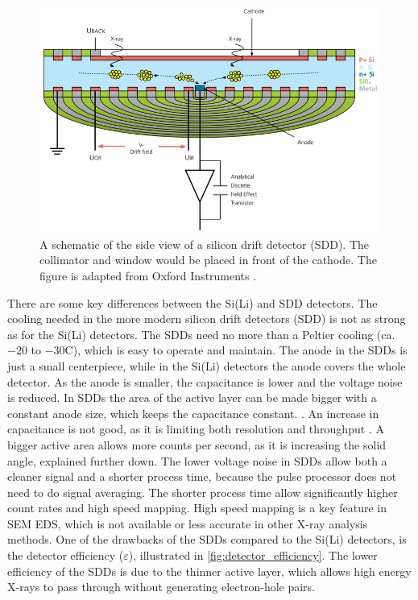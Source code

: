 \begin{figure}[pht]
    \centering
    \includegraphics[width=0.89\linewidth]{figures/EDS_SDD.png}
    \caption{
        A schematic of the side view of a silicon drift detector (SDD).
        The collimator and window would be placed in front of the cathode.
        The figure is adapted from Oxford Instruments \cite{oxford_sdd_explained}.
    }
    \label{fig:eds_sdd}
\end{figure}



There are some key differences between the Si(Li) and SDD detectors. 
The cooling needed in the more modern silicon drift detectors (SDD) is not as strong as for the Si(Li) detectors. 
The SDDs need no more than a Peltier cooling (ca. $-20 $ to $-30$\textdegree C), which is easy to operate and maintain.
The anode in the SDDs is just a small centerpiece, while in the Si(Li) detectors the anode covers the whole detector.
As the anode is smaller, the capacitance is lower and the voltage noise is reduced.
In SDDs the area of the active layer can be made bigger with a constant anode size, which keeps the capacitance constant. \cite{notaros_electromagnetics_2010}.
An increase in capacitance is not good, as it is limiting both resolution and throughput \cite[Ch. 16.3.9]{goldstein_scanning_2018}.
A bigger active area allows more counts per second, as it is increasing the solid angle, explained further down.
The lower voltage noise in SDDs allow both a cleaner signal and a shorter process time, because the pulse processor does not need to do signal averaging.
The shorter process time allow significantly higher count rates and high speed mapping.
High speed mapping is a key feature in SEM EDS, which is not available or less accurate in other X-ray analysis methods.
One of the drawbacks of the SDDs compared to the Si(Li) detectors, is the detector efficiency ($\varepsilon$), illustrated in \cref{fig:detector_efficiency}.
The lower efficiency of the SDDs is due to the thinner active layer, which allows high energy X-rays to pass through without generating electron-hole pairs.


